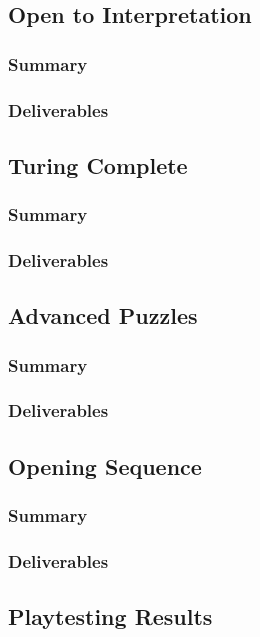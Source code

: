 \documentclass{article}
\begin{document}
\subsection{Open to Interpretation}
\subsubsection{Summary}
\subsubsection{Deliverables}

\subsection{Turing Complete}
\subsubsection{Summary}
\subsubsection{Deliverables}

\subsection{Advanced Puzzles}
\subsubsection{Summary}
\subsubsection{Deliverables}

\subsection{Opening Sequence}
\subsubsection{Summary}
\subsubsection{Deliverables}

\subsection{Playtesting Results}
\end{document}

